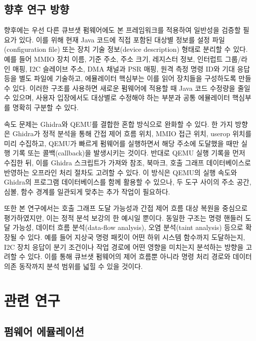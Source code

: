 \documentclass[master,korean,final]{kaist-ucs}
\begin{document}
\section{향후 연구 방향}

향후에는 우선 다른 큐브샛 펌웨어에도 본 프레임워크를 적용하여 일반성을 검증할 필요가 있다. 이를 위해 현재 Java 코드에 직접 포함된 대상별 정보를 설정 파일(configuration file) 또는 장치 기술 정보(device description) 형태로 분리할 수 있다. 예를 들어 MMIO 장치 이름, 기준 주소, 주소 크기, 레지스터 정보, 인터럽트 그룹/라인 매핑, I2C 슬레이브 주소, DMA 채널과 PSR 매핑, 원격 측정 명령 ID와 기대 응답 등을 별도 파일에 기술하고, 에뮬레이터 핵심부는 이를 읽어 장치들을 구성하도록 만들 수 있다. 이러한 구조를 사용하면 새로운 펌웨어에 적용할 때 Java 코드 수정량을 줄일 수 있으며, 사용자 입장에서도 대상별로 수정해야 하는 부분과 공통 에뮬레이터 핵심부를 명확히 구분할 수 있다.

속도 문제는 Ghidra와 QEMU를 결합한 혼합 방식으로 완화할 수 있다. 한 가지 방향은 Ghidra가 정적 분석을 통해 간접 제어 흐름 위치, MMIO 접근 위치, userop 위치를 미리 수집하고, QEMU가 빠르게 펌웨어를 실행하면서 해당 주소에 도달했을 때만 실행 기록 또는 콜백(callback)을 발생시키는 것이다. 반대로 QEMU 실행 기록을 먼저 수집한 뒤, 이를 Ghidra 스크립트가 가져와 참조, 북마크, 호출 그래프 데이터베이스로 반영하는 오프라인 처리 절차도 고려할 수 있다. 이 방식은 QEMU의 실행 속도와 Ghidra의 프로그램 데이터베이스를 함께 활용할 수 있으나, 두 도구 사이의 주소 공간, 심볼, 함수 경계를 일관되게 맞추는 추가 작업이 필요하다.

또한 본 연구에서는 호출 그래프 도달 가능성과 간접 제어 흐름 대상 복원을 중심으로 평가하였지만, 이는 정적 분석 보강의 한 예시일 뿐이다. 동일한 구조는 명령 핸들러 도달 가능성, 데이터 흐름 분석(data-flow analysis), 오염 분석(taint analysis) 등으로 확장될 수 있다. 예를 들어 지상국 명령 패킷이 어떤 하위 시스템 함수까지 도달하는지, I2C 장치 응답이 분기 조건이나 작업 경로에 어떤 영향을 미치는지 분석하는 방향을 고려할 수 있다. 이를 통해 큐브샛 펌웨어의 제어 흐름뿐 아니라 명령 처리 경로와 데이터 의존 동작까지 분석 범위를 넓힐 수 있을 것이다.

\chapter{관련 연구}

\section{펌웨어 에뮬레이션}
\end{document}
